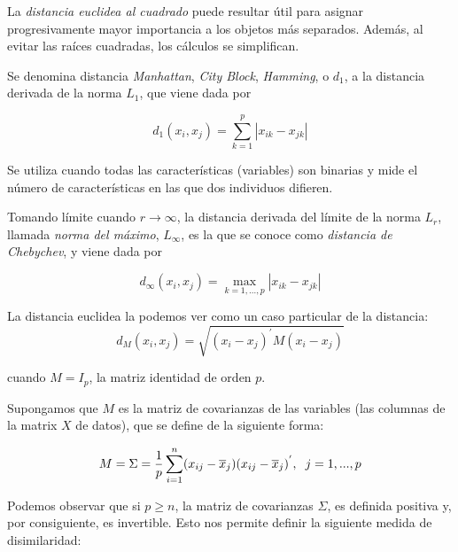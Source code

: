 \begin{observacion}
La \textit{distancia euclidea al cuadrado} puede resultar útil para asignar progresivamente mayor importancia a los objetos más separados. Además, al evitar las
raíces cuadradas, los cálculos se simplifican.
\end{observacion}


\begin{definicion}

    Se denomina distancia \textit{Manhattan}, \textit{City Block}, \textit{Hamming}, o \textit{$d_{1}$}, a la distancia derivada de la norma $L_{1}$, que viene dada por
    
    \[
    d_{1}(x_{i},x_{j}) = \sum_{k=1}^{p} |x_{ik}-x_{jk}|
    \]
    
\end{definicion}

Se utiliza cuando todas las características (variables) son binarias y mide el número de características en las que dos individuos difieren.

\begin{definicion}  %
    
    Tomando límite cuando $r \rightarrow \infty$, la distancia derivada del límite de la norma $L_{r}$, llamada \textit{norma del máximo}, $L_{\infty}$, es la que se conoce
    como \textit{distancia de Chebychev}, y viene dada por

    \[
    d_{\infty}(x_{i},x_{j}) = \max_{k=1,\dots,p} |x_{ik}-x_{jk}|
    \]
\end{definicion}

\begin{observacion}
    La distancia euclidea la podemos ver como un caso particular de la distancia:
    \[
    d_{M}(x_{i},x_{j}) = \sqrt{(x_{i}-x_{j})^{'}M(x_{i}-x_{j})}
    \]

    cuando $M=I_{p}$, la matriz identidad de orden $p$.
\end{observacion}

Supongamos que $M$ es la matriz de covarianzas de las variables (las columnas de la matrix $X$ de datos), que se define de la siguiente forma:

\[
M=\Sigma = \frac{1}{p} \sum_{i=1}^{n}(x_{ij}-\overline{x}_{j})(x_{ij}-\overline{x}_{j})^{'}, \hspace{0.2cm} j=1,...,p 
\]

Podemos observar que si $p \geq n$, la matriz de covarianzas $\Sigma$, es definida positiva y, por consiguiente, es invertible. Esto nos permite 
definir la siguiente medida de disimilaridad:

